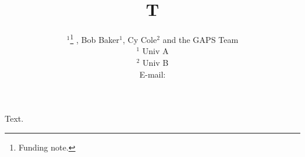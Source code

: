 \documentclass{PoS}
\title{T}
\author{{\speaker{Ann Able}$^1$\thanks{Funding note.} , Bob Baker$^1$, Cy Cole$^2$ and the GAPS Team} \\
  $^1$ Univ A\\
  $^2$ Univ B\\
  E-mail: \email{ann@a.org}}
\begin{document}
\maketitle
Text.
\end{document}

